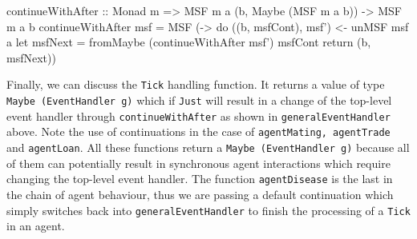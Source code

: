 \begin{HaskellCode}
continueWithAfter :: Monad m => MSF m a (b, Maybe (MSF m a b)) -> MSF m a b
continueWithAfter msf = MSF (\a -> do
  ((b, msfCont), msf') <- unMSF msf a
  let msfNext = fromMaybe (continueWithAfter msf') msfCont
  return (b, msfNext))
\end{HaskellCode}

Finally, we can discuss the \texttt{Tick} handling function. It returns a value of type \texttt{Maybe (EventHandler g)} which if \texttt{Just} will result in a change of the top-level event handler through \texttt{continueWithAfter} as shown in \texttt{generalEventHandler} above. Note the use of continuations in the case of \texttt{agentMating, agentTrade} and \texttt{agentLoan}. All these functions return a \texttt{Maybe (EventHandler g)} because all of them can potentially result in synchronous agent interactions which require changing the top-level event handler. The function \texttt{agentDisease} is the last in the chain of agent behaviour, thus we are passing a default continuation which simply switches back into \texttt{generalEventHandler} to finish the processing of a \texttt{Tick} in an agent.


